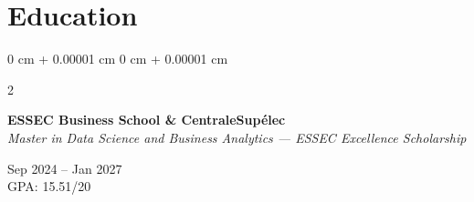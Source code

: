 \documentclass[10pt, letterpaper]{article}
\newenvironment{highlights}{
    \begin{itemize}[
        topsep=0.04 cm,
        parsep=0.02cm,
        partopsep=0pt,
        itemsep=0pt,
        leftmargin=0 cm + 10pt
    ]
}{
    \end{itemize}
} %
\newcommand{\stronglink}[2]{%
    \href{#1}{\textbf{\uline{\textcolor{blue}{#2}}}}%
}
\newenvironment{onecolentry}{
    \begin{adjustwidth}{
        0 cm + 0.00001 cm
    }{
        0 cm + 0.00001 cm
    }
}{
    \end{adjustwidth}
} %
\newenvironment{twocolentry}[2][]{
    \onecolentry
    \def\secondColumn{#2}
    \setcolumnwidth{\fill, 3.8 cm}
    \begin{paracol}{2}
}{
    \switchcolumn \raggedleft \secondColumn
    \end{paracol}
    \endonecolentry
} %
\begin{document}

    \vspace{0.2 cm}

    \section{Education}
        \begin{twocolentry}{Sep 2024 – Jan 2027 \\ GPA: 15.51/20}
            \textbf{ESSEC Business School \& CentraleSupélec} \\
            \textit{Master in Data Science and Business Analytics — ESSEC Excellence Scholarship}
        \end{twocolentry}
        
        
\end{document}
